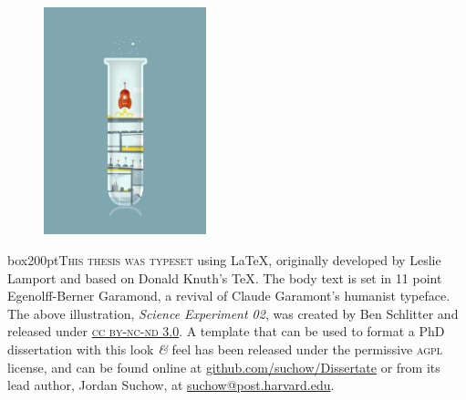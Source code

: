 \newpage

\begin{figure}
  \vspace{20pt}
  \centering
  \hspace*{-32pt}
  \includegraphics[width=0.42\textwidth]{endmatter/colophon.png}
\end{figure}


\begin{center}
box{200pt}{\lettrine[lines=3,slope=-2pt,nindent=-4pt]{\textcolor{SchoolColor}{T}}{his thesis was typeset} using \LaTeX, originally developed by Leslie Lamport and based on Donald Knuth's \TeX. The body text is set in 11 point Egenolff-Berner Garamond, a revival of Claude Garamont's humanist typeface. The above illustration, \textit{Science Experiment 02}, was created by Ben Schlitter and released under \href{http://creativecommons.org/licenses/by-nc-nd/3.0/}{\textsc{cc by-nc-nd 3.0}}. A template that can be used to format a PhD dissertation with this look \textit{\&} feel has been released under the permissive \textsc{agpl} license, and can be found online at \href{https://github.com/suchow/Dissertate}{github.com/suchow/Dissertate} or from its lead author, Jordan Suchow, at \href{mailto:suchow@post.harvard.edu}{suchow@post.harvard.edu}.}
\end{center}
